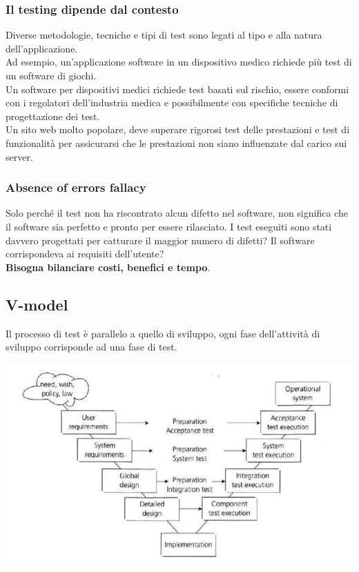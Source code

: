 \documentclass[10pt, a4paper]{article}
\begin{document}
\subsubsection*{Il testing dipende dal contesto}
Diverse metodologie, tecniche e tipi di test sono legati al tipo e alla natura
dell'applicazione.\\
Ad esempio, un'applicazione software in un dispositivo medico richiede più test
di un software di giochi.\\
Un software per dispositivi medici richiede test basati sul rischio, essere
conformi con i regolatori dell'industria medica e possibilmente con specifiche
tecniche di progettazione dei test.\\
Un sito web molto popolare, deve superare rigorosi test delle prestazioni e
test di funzionalità per assicurarsi che le prestazioni non siano influenzate dal
carico sui server.

\subsubsection*{Absence of errors fallacy}
Solo perché il test non ha riscontrato alcun difetto nel software, non significa
che il software sia perfetto e pronto per essere rilasciato.
I test eseguiti sono stati davvero progettati per catturare il maggior numero di
difetti? Il software corrispondeva ai requisiti dell'utente?\\
\textbf{Bisogna bilanciare costi, benefici e tempo}.

\subsection{V-model}
\begin{minipage}{0.4\textwidth}
Il processo di test è parallelo a quello di sviluppo, ogni fase dell'attività di sviluppo corrisponde ad una fase di test.
\end{minipage}
\begin{minipage}{0.6\textwidth}
    \includegraphics[width=\textwidth]{img/vmodel.jpg}
\end{minipage}
\end{document}
